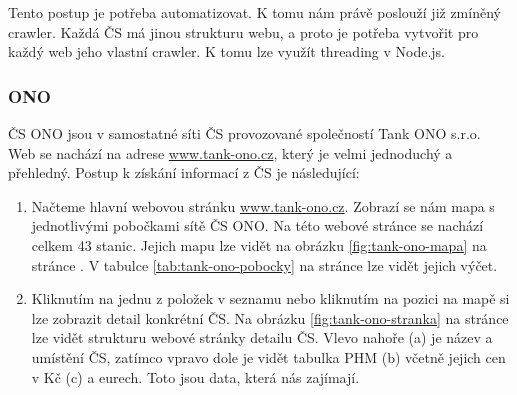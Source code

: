 Tento postup je potřeba automatizovat. K tomu nám právě poslouží již
zmíněný crawler. Každá ČS má jinou strukturu webu, a proto je potřeba
vytvořit pro každý web jeho vlastní crawler. K tomu lze využít threading
v Node.js.

\subsubsection{ONO}

ČS ONO jsou v samostatné síti ČS provozované společností Tank ONO s.r.o.
Web se nachází na adrese \url{www.tank-ono.cz}, který je velmi jednoduchý
a přehledný. Postup k získání informací z ČS je následující:

\begin{enumerate}
    \item Načteme hlavní webovou stránku \url{www.tank-ono.cz}. Zobrazí
        se nám mapa s jednotlivými pobočkami sítě ČS ONO. Na této webové
        stránce se nachází celkem 43 stanic. Jejich mapu lze vidět
        na obrázku \ref{fig:tank-ono-mapa} na stránce
        \pageref{fig:tank-ono-mapa}. V tabulce \ref{tab:tank-ono-pobocky}
        na stránce \pageref{tab:tank-ono-pobocky} lze vidět jejich výčet.
    \item Kliknutím na jednu z položek v seznamu nebo kliknutím na pozici
        na mapě si lze zobrazit detail konkrétní ČS. Na obrázku
        \ref{fig:tank-ono-stranka} na stránce \pageref{fig:tank-ono-stranka}
        lze vidět strukturu webové stránky detailu ČS. Vlevo nahoře (a) je název
        a umístění ČS, zatímco vpravo dole je vidět tabulka PHM (b) včetně jejich
        cen v Kč (c) a eurech. Toto jsou data, která nás zajímají.
\end{enumerate}

\newpage

